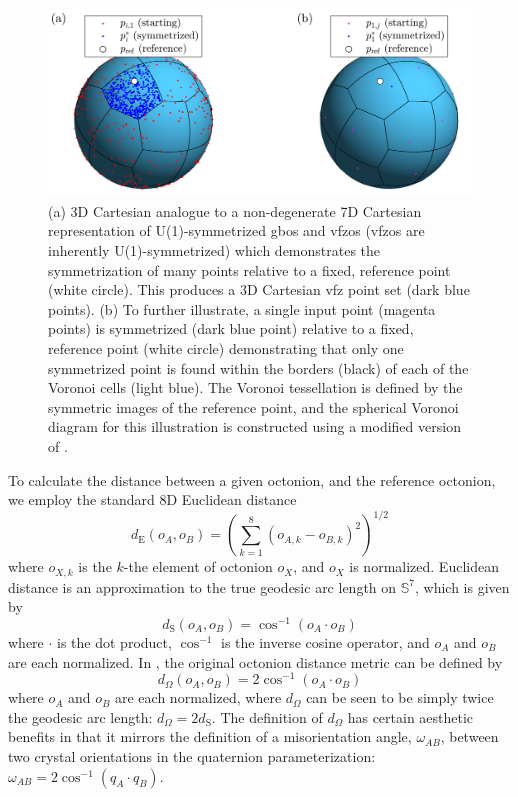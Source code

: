 \documentclass[final,twocolumn,12pt]{elsarticle}
\newcommand{\singlept}{magenta points}
\newcommand{\sympt}{dark blue points}
\newcommand{\singlesympt}{dark blue point}
\newcommand{\refpt}{white circle}
\newcommand{\vbordercolor}{black}
\newcommand{\vcellcolor}{light blue}
\begin{document}
\begin{figure}
    \centering
    \includegraphics[scale=1]{voronoi.png}
    \caption{(a) 3D Cartesian analogue to a non-degenerate 7D Cartesian representation of U(1)-symmetrized \glspl{gbo} and \glspl{vfzo} (\glspl{vfzo} are inherently U(1)-symmetrized) which demonstrates the symmetrization of many points relative to a fixed, reference point (\refpt{}). This produces a 3D Cartesian \gls{vfz} point set (\sympt{}). (b) To further illustrate, a single input point (\singlept{}) is symmetrized (\singlesympt{}) relative to a fixed, reference point (\refpt{}) demonstrating that only one symmetrized point is found within the borders (\vbordercolor{}) of each of the Voronoi cells (\vcellcolor{}). The Voronoi tessellation is defined by the symmetric images of the reference point, and the spherical Voronoi diagram for this illustration is constructed using a modified version of \cite{luongVoronoiSphere2020}.}
    \label{fig:voronoi}
\end{figure}

To calculate the distance between a given octonion, and the reference octonion, we employ the standard 8D Euclidean distance
\begin{equation}
    \label{eq:8Deuclidean_dist}
    d_{\text{E}}\!\left(o_{A},o_{B}\right) = {\left(\sum_{k=1}^{8} {\left(o_{A,k} - o_{B,k}\right)}^2 \right)}^{1/2}
\end{equation}
where $o_{X,k}$ is the $k$-the element of octonion $o_X$, and $o_X$ is normalized. Euclidean distance is an approximation to the true geodesic arc length on $\mathbb{S}^7$, which is given by
\begin{equation}
    \label{eq:7sphere_arc_length}
    d_{\text{S}}\!\left(o_{A},o_{B}\right)=\cos ^{-1}\left(o_A\cdot o_B\right)
\end{equation}
where $\cdot$ is the dot product, $\cos ^{-1}$ is the inverse cosine operator, and $o_A$ and $o_B$ are each normalized. In \cite{francisGeodesicOctonionMetric2019}, the original octonion distance metric can be defined by
\begin{equation}
    \label{eq:omega}
    d_\Omega\!\left(o_{A},o_{B}\right) = 2\cos ^{-1}\left(o_A\cdot o_B\right)
\end{equation}
where $o_A$ and $o_B$ are each normalized, where $d_\Omega$ can be seen to be simply twice the geodesic arc length: $d_\Omega = 2 d_{\text{S}}$. The definition of $d_\Omega$ has certain aesthetic benefits in that it mirrors the definition of a misorientation angle, $\omega_{AB}$, between two crystal orientations in the quaternion parameterization: $\omega_{AB} = 2 \cos^{-1}{\left(q_A \cdot q_B\right)}$.
\end{document}

